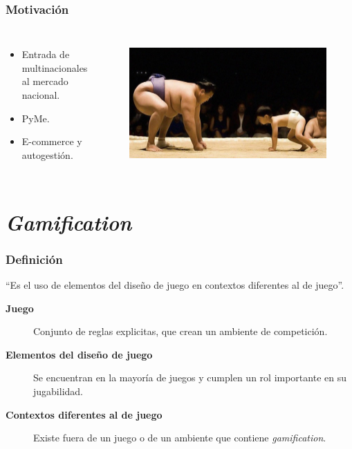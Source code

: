\documentclass[10pt, compress]{beamer}
\begin{document}
\begin{frame}[fragile]
  \frametitle{Motivación}
\begin{columns}[onlytextwidth]
\begin{itemize}
\item Entrada de multinacionales \\
al mercado nacional.
\item PyMe. 
\item E-commerce y autogestión.
\end{itemize}

\begin{figure}
\centering
    \includegraphics[width=1\textwidth]{images/pymes.jpg}
    \label{fig:awesom_image}
\end{figure}
\end{columns}
\end{frame}

\section{\emph{Gamification}}

\begin{frame}[fragile]
  \frametitle{Definición}
     ``Es el uso de elementos del diseño de juego en contextos diferentes al de juego''.

\begin{description}
 \item[\textbf{Juego}] Conjunto de reglas explicitas, que crean un ambiente de competición.
 \item[\textbf{Elementos del diseño de juego}] Se encuentran en la mayoría de juegos y cumplen un rol importante 
en su jugabilidad.
 \item[\textbf{Contextos diferentes al de juego}] Existe fuera de un juego o de un ambiente que contiene \emph{gamification}.
\end{description}
\end{frame}
\end{document}
